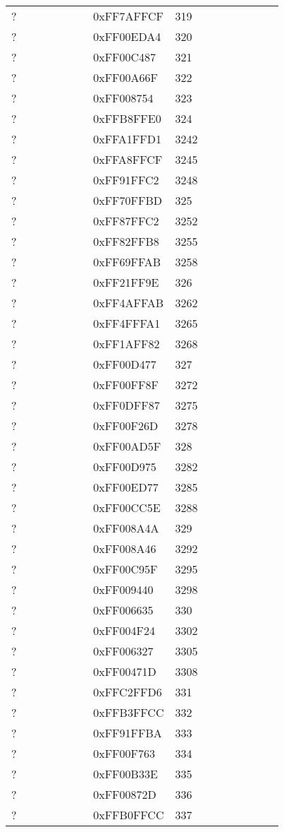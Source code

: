 \begin{longtable}{p{0.3\linewidth} p{0.3\linewidth} p{0.4\linewidth}}
? &  0xFF7AFFCF &  319\\
? &  0xFF00EDA4 &  320\\
? &  0xFF00C487 &  321\\
? &  0xFF00A66F &  322\\
? &  0xFF008754 &  323\\
? &  0xFFB8FFE0 &  324\\
? &  0xFFA1FFD1 &  3242\\
? &  0xFFA8FFCF &  3245\\
? &  0xFF91FFC2 &  3248\\
? &  0xFF70FFBD &  325\\
? &  0xFF87FFC2 &  3252\\
? &  0xFF82FFB8 &  3255\\
? &  0xFF69FFAB &  3258\\
? &  0xFF21FF9E &  326\\
? &  0xFF4AFFAB &  3262\\
? &  0xFF4FFFA1 &  3265\\
? &  0xFF1AFF82 &  3268\\
? &  0xFF00D477 &  327\\
? &  0xFF00FF8F &  3272\\
? &  0xFF0DFF87 &  3275\\
? &  0xFF00F26D &  3278\\
? &  0xFF00AD5F &  328\\
? &  0xFF00D975 &  3282\\
? &  0xFF00ED77 &  3285\\
? &  0xFF00CC5E &  3288\\
? &  0xFF008A4A &  329\\
? &  0xFF008A46 &  3292\\
? &  0xFF00C95F &  3295\\
? &  0xFF009440 &  3298\\
? &  0xFF006635 &  330\\
? &  0xFF004F24 &  3302\\
? &  0xFF006327 &  3305\\
? &  0xFF00471D &  3308\\
? &  0xFFC2FFD6 &  331\\
? &  0xFFB3FFCC &  332\\
? &  0xFF91FFBA &  333\\
? &  0xFF00F763 &  334\\
? &  0xFF00B33E &  335\\
? &  0xFF00872D &  336\\
? &  0xFFB0FFCC &  337\\

\end{longtable}
